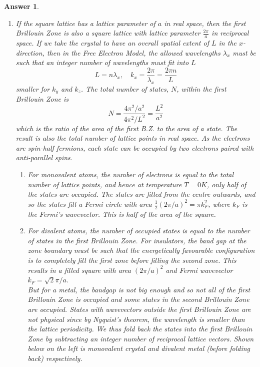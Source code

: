 \documentclass[a4paper]{article}
\newtheorem{ans}{Answer}[subsection]
\theoremstyle{new}
\begin{document}
\begin{ans}\leavevmode
\begin{enumerate}[label=(\alph*)]
\item If the square lattice has a lattice parameter of $a$ in real space, then the first Brillouin Zone is also a square lattice with lattice parameter $\frac{2\pi}{a}$ in reciprocal space. If we take the crystal to have an overall spatial extent of $L$ in the $x$-direction, then in the Free Electron Model, the allowed wavelengths $\lambda_x$ must be such that an integer number of wavelengths must fit into $L$
$$L=n\lambda_x,\quad k_x=\frac{2\pi}{\lambda_x}=\frac{2\pi n}{L}$$
smaller for $k_y$ and $k_z$. The total number of states, $N$, within the first Brillouin Zone is
$$N=\frac{4\pi^2/a^2}{4\pi^2/L^2}=\frac{L^2}{a^2}$$
which is the ratio of the area of the first B.Z. to the area of a state. The result is also the total number of lattice points in real space. As the electrons are spin-half fermions, each state can be occupied by two electrons paired with anti-parallel spins.
\begin{enumerate}[label=\roman*]
    \item For monovalent atoms, the number of electrons is equal to the total number of lattice points, and hence at temperature $T=0K$, only half of the states are occupied. The states are filled from the centre outwards, and so the states fill a Fermi circle with area $\frac{1}{2}(2\pi/a)^2=\pi k_F^2$, where $k_F$ is the Fermi's wavevector. This is half of the area of the square.
    \item For divalent atoms, the number of occupied states is equal to the number of states in the first Brillouin Zone. For insulators, the band gap at the zone boundary must be such that the energetically favourable configuration is to completely fill the first zone before filling the second zone. This results in a filled square with area $(2\pi/a)^2$ and Fermi wavevector $k_F=\sqrt{2}\pi/a$.\\[5pt]
    But for a metal, the bandgap is not big enough and so not all of the first Brillouin Zone is occupied and some states in the second Brillouin Zone are occupied. States with wavevectors outside the first Brillouin Zone are not physical since by Nyquist's theorem, the wavelength is smaller than the lattice periodicity. We thus fold back the states into the first Brillouin Zone by subtracting an integer number of reciprocal lattice vectors. Shown below on the left is monovalent crystal and divalent metal (before folding back) respectively.
\end{enumerate}

\end{enumerate}
\end{ans}
\end{document}
